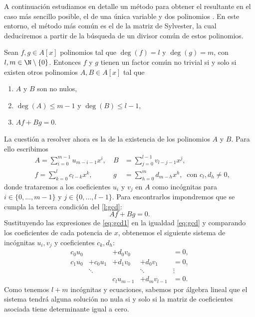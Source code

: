 A continuación estudiamos en detalle un método para obtener el resultante en el caso más sencillo posible, el de una única variable y dos polinomios \cite{ideals_varieties}. En este entorno, el método más común es el de la matriz de Sylvester, la cual deduciremos a partir de la búsqueda de un divisor común de estos polinomios.
\begin{lema}\label{l:gcd}
    Sean $f,g\in A[x]$ polinomios tal que $\deg(f) = l$ y $\deg(g) = m$, con $l,m \in \N\setminus \{0\}$. Entonces $f$ y $g$ tienen un factor común no trivial si y solo si existen otros polinomios $A,B \in A[x]$ tal que
    \begin{enumerate}
        \item $A$ y $B$ son no nulos,
        \item $\deg(A)\le m-1$ y $\deg(B)\le l-1$,
        \item $Af+Bg = 0$.
    \end{enumerate}
\end{lema}
La cuestión a resolver ahora es la de la existencia de los polinomios $A$ y $B$. Para ello escribimos
\begin{align}\label{eq:gcd1}
    &A = \sum_{i=0}^{m-1} u_{m-i-1} x^i,   \ &B &= \sum_{j=0}^{l-1} v_{l-j-1} x^j,\\
    &f = \sum_{k=0}^l c_{l-k} x^k,         \ &g &= \sum_{h=0}^m d_{m-h} x^h,\ \text{ con } c_l, d_h\neq 0,
\end{align}
donde trataremos a los coeficientes $u_i$ y $v_j$ en $A$ como incógnitas para $i\in\{0,\dots, m-1\}$ y $j\in \{0,\dots, l-1\}$. Para encontrarlos impondremos que se cumpla la tercera condición del \autoref{l:gcd}:
\begin{equation}\label{eq:gcd}
Af + Bg = 0.    
\end{equation}
Sustituyendo las expresiones de \eqref{eq:gcd1} en la igualdad \eqref{eq:gcd} y comparando los coeficientes de cada potencia de $x$, obtenemos el siguiente sistema de incógnitas $u_i,v_j$ y coeficientes $c_k,d_h$:
\begin{align*}
    c_0u_0  &              &+ d_0v_0       &                        &= 0,\\
    c_1u_0  &+ c_0u_1&+ d_1v_0       &+ d_0v_1               &= 0,\\
            &\ddots        &               & \ddots                &\vdots\\
            &              &c_lu_{m-1}     &+          d_mv_{l-1}  &=0.
\end{align*}
Como tenemos $l+m$ incógnitas y ecuaciones, sabemos por álgebra lineal que el sistema tendrá alguna solución no nula si y solo si la matriz de coeficientes asociada tiene determinante igual a cero.
